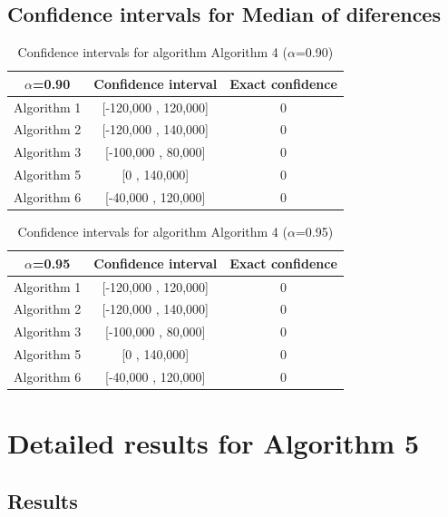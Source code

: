 \documentclass[a4paper,10pt]{article}
\begin{document}
\subsection{Confidence intervals for Median of diferences}

\begin{table}[!htp]
\centering\small
\begin{tabular}{
|c|c|c|}
\hline
 $\alpha$=0.90 & Confidence interval & Exact confidence \\ \hline 
Algorithm 1 & [-120,000 , 120,000] & 0\\ \hline 
Algorithm 2 & [-120,000 , 140,000] & 0\\ \hline 
Algorithm 3 & [-100,000 , 80,000] & 0\\ \hline 
Algorithm 5 & [0 , 140,000] & 0\\ \hline 
Algorithm 6 & [-40,000 , 120,000] & 0\\ \hline 

\end{tabular}
\caption{Confidence intervals for algorithm Algorithm 4 ($\alpha$=0.90)}
\end{table}
\begin{table}[!htp]
\centering\small
\begin{tabular}{
|c|c|c|}
\hline
 $\alpha$=0.95 & Confidence interval & Exact confidence \\ \hline 
Algorithm 1 & [-120,000 , 120,000] & 0\\ \hline 
Algorithm 2 & [-120,000 , 140,000] & 0\\ \hline 
Algorithm 3 & [-100,000 , 80,000] & 0\\ \hline 
Algorithm 5 & [0 , 140,000] & 0\\ \hline 
Algorithm 6 & [-40,000 , 120,000] & 0\\ \hline 

\end{tabular}
\caption{Confidence intervals for algorithm Algorithm 4 ($\alpha$=0.95)}
\end{table}

 \clearpage 


\section{Detailed results for Algorithm 5}


\subsection{Results}
\end{document}

